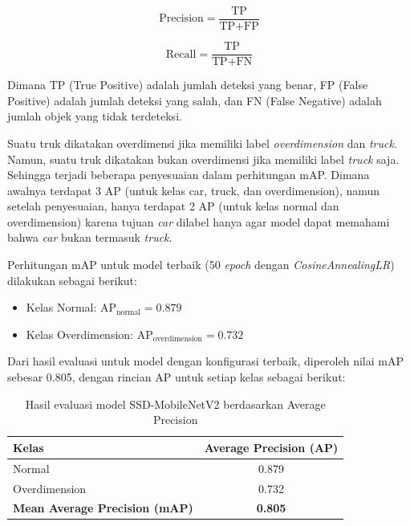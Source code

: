 \begin{equation}
\mbox{Precision} = \frac{\mbox{TP}}{\mbox{TP} + \mbox{FP}}
\label{eq:precision}
\end{equation}

\begin{equation}
\mbox{Recall} = \frac{\mbox{TP}}{\mbox{TP} + \mbox{FN}}
\label{eq:recall}
\end{equation}

Dimana TP (True Positive) adalah jumlah deteksi yang benar, FP (False Positive) adalah jumlah deteksi yang salah, dan FN (False Negative) adalah jumlah objek yang tidak terdeteksi.

Suatu truk dikatakan overdimensi jika memiliki label \emph{overdimension} dan \emph{truck}. Namun, suatu truk dikatakan bukan overdimensi jika memiliki label \emph{truck} saja. Sehingga terjadi beberapa penyesuaian dalam perhitungan mAP. Dimana awalnya terdapat 3 AP (untuk kelas car, truck, dan overdimension), namun setelah penyesuaian, hanya terdapat 2 AP (untuk kelas normal dan overdimension) karena tujuan \emph{car} dilabel hanya agar model dapat memahami bahwa \emph{car} bukan termasuk \emph{truck}.

Perhitungan mAP untuk model terbaik (50 \emph{epoch} dengan \emph{CosineAnnealingLR}) dilakukan sebagai berikut:

\begin{itemize}
  \item Kelas Normal: $\mbox{AP}_{\mbox{normal}} = 0.879$
  \item Kelas Overdimension: $\mbox{AP}_{\mbox{overdimension}} = 0.732$
\end{itemize}

Dari hasil evaluasi untuk model dengan konfigurasi terbaik, diperoleh nilai mAP sebesar 0.805, dengan rincian AP untuk setiap kelas sebagai berikut:

\begin{table}[htbp]
  \centering
  \begin{tabular}{|l|c|}
    \hline
    \rowcolor[HTML]{C0C0C0}
    \textbf{Kelas} & \textbf{Average Precision (AP)} \\
    \hline
    Normal & 0.879 \\
    \hline
    Overdimension & 0.732 \\
    \hline
    \textbf{Mean Average Precision (mAP)} & \textbf{0.805} \\
    \hline
  \end{tabular}
  \caption{Hasil evaluasi model SSD-MobileNetV2 berdasarkan Average Precision}
  \label{tab:ap_results}
\end{table}

